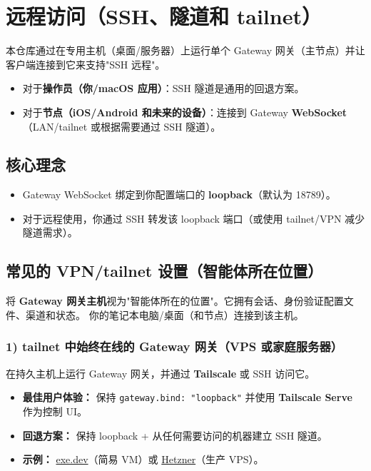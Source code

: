 \section{远程访问（SSH、隧道和 tailnet）}


本仓库通过在专用主机（桌面/服务器）上运行单个 Gateway 网关（主节点）并让客户端连接到它来支持"SSH 远程"。

\begin{itemize}
  \item 对于\textbf{操作员（你/macOS 应用）}：SSH 隧道是通用的回退方案。
  \item 对于\textbf{节点（iOS/Android 和未来的设备）}：连接到 Gateway \textbf{WebSocket}（LAN/tailnet 或根据需要通过 SSH 隧道）。
\end{itemize}


\subsection{核心理念}


\begin{itemize}
  \item Gateway WebSocket 绑定到你配置端口的 \textbf{loopback}（默认为 18789）。
  \item 对于远程使用，你通过 SSH 转发该 loopback 端口（或使用 tailnet/VPN 减少隧道需求）。
\end{itemize}


\subsection{常见的 VPN/tailnet 设置（智能体所在位置）}


将 \textbf{Gateway 网关主机}视为"智能体所在的位置"。它拥有会话、身份验证配置文件、渠道和状态。
你的笔记本电脑/桌面（和节点）连接到该主机。

\subsubsection{1) tailnet 中始终在线的 Gateway 网关（VPS 或家庭服务器）}


在持久主机上运行 Gateway 网关，并通过 \textbf{Tailscale} 或 SSH 访问它。

\begin{itemize}
  \item \textbf{最佳用户体验：} 保持 \texttt{gateway.bind: "loopback"} 并使用 \textbf{Tailscale Serve} 作为控制 UI。
  \item \textbf{回退方案：} 保持 loopback + 从任何需要访问的机器建立 SSH 隧道。
  \item \textbf{示例：} \href{/install/exe-dev}{exe.dev}（简易 VM）或 \href{/install/hetzner}{Hetzner}（生产 VPS）。
\end{itemize}


